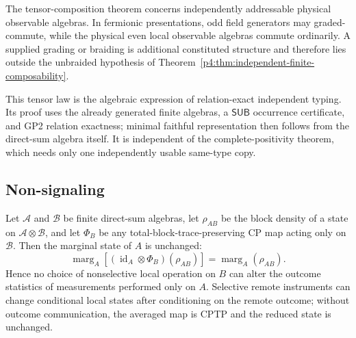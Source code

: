 \documentclass[12pt,a4paper]{article}
\begin{document}
\begin{remark}
The tensor-composition theorem concerns independently addressable physical observable
algebras.  In fermionic presentations, odd field generators may graded-commute, while
the physical even local observable algebras commute ordinarily.  A supplied grading or
braiding is additional constituted structure and therefore lies outside the unbraided
hypothesis of Theorem~\ref{p4:thm:independent-finite-composability}.
\end{remark}

This tensor law is the algebraic expression of relation-exact independent
typing.  Its proof uses the already generated finite algebras, a
\(\mathsf{SUB}\) occurrence certificate, and GP2 relation exactness; minimal
faithful representation then follows from the direct-sum algebra itself.  It
is independent of the complete-positivity theorem, which needs only one
independently usable same-type copy.



\subsection{Non-signaling}
\label{p4:sec:part1-nonsignaling}


\begin{theorem}
\label{p4:thm:nonsignaling}
Let \(\mathcal A\) and \(\mathcal B\) be finite direct-sum algebras, let
\(\rho_{AB}\) be the block density of a state on
\(\mathcal A\otimes\mathcal B\), and let
\(\Phi_B\) be any total-block-trace-preserving CP map acting only on
\(\mathcal B\).  Then the marginal state of \(A\) is unchanged:
\begin{equation}
\label{p4:eq:nonsignaling}
\operatorname{marg}_A\!\left[
(\operatorname{id}_A\otimes\Phi_B)(\rho_{AB})\right]
=\operatorname{marg}_A(\rho_{AB}).
\end{equation}
Hence no choice of nonselective local operation on $B$ can alter the outcome statistics of measurements performed only on $A$.  Selective remote instruments can change conditional local states after conditioning on the remote outcome; without outcome communication, the averaged map is CPTP and the reduced state is unchanged.
\end{theorem}
\end{document}
